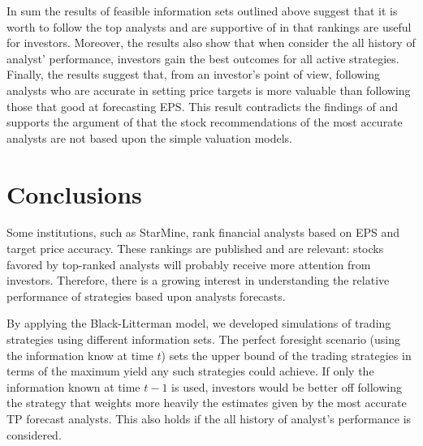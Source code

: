 \documentclass{article}\usepackage[]{graphicx}\usepackage[]{color}
\newcommand{\tr}{\textit{true}}
\newcommand{\naive}{\textit{recent}}
\newcommand{\default}{\textit{all-time}}
\begin{document}
In sum the results of  feasible information sets outlined above suggest that  it is worth to follow the top analysts and are supportive of \cite{desai2000ass} in that rankings are useful for investors. Moreover, the results also show  that when consider the all history of  analyst' performance, investors gain the best outcomes for all active  strategies.    Finally, the results suggest that, from an investor's point of view, following analysts who are accurate in setting price targets is more valuable than following those that good at forecasting EPS.  This result contradicts the findings of \cite{bradshaw2004} and supports the argument of \cite{simon2011} that the stock recommendations of the most accurate analysts are not based upon the simple valuation models.

\section{Conclusions}
\label{sec:conclusion}

Some institutions, such as StarMine, rank financial analysts based on EPS and target price accuracy. These rankings are published and are relevant: stocks favored by top-ranked analysts will probably receive more attention from investors. Therefore, there is a growing interest in understanding the relative performance of strategies based upon analysts forecasts.

By applying the Black-Litterman model, we developed simulations of trading strategies using  different information sets. The perfect foresight scenario (using the information know at time $t$) sets the upper bound of the trading strategies in terms of the maximum yield any such strategies could achieve. If only the information known at time $t-1$ is used, investors would be better off following the strategy that weights more heavily the estimates given by the most accurate TP forecast analysts. This also holds if the all history of analyst's performance is considered. 


\end{document}
